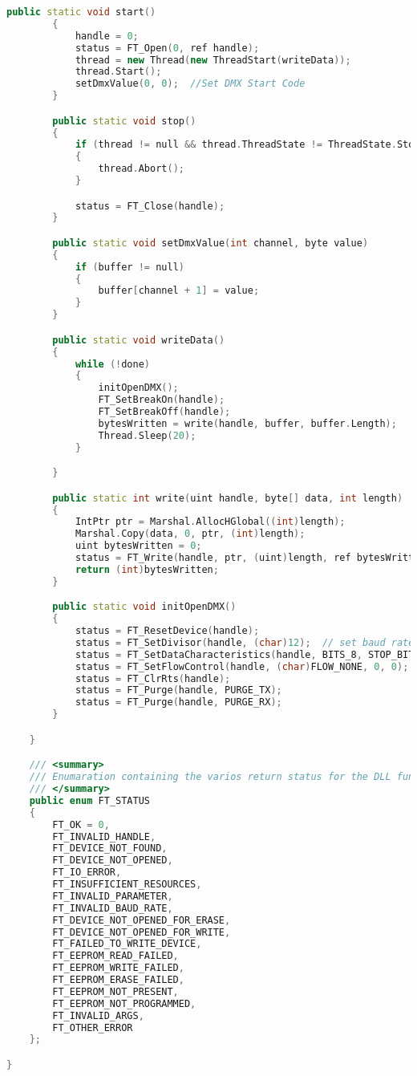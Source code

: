 \begin{lstlisting}[language=C++]
        public static void start()
        {
            handle = 0;
            status = FT_Open(0, ref handle);
            thread = new Thread(new ThreadStart(writeData));
            thread.Start();
            setDmxValue(0, 0);  //Set DMX Start Code
        }

        public static void stop()
        {
            if (thread != null && thread.ThreadState != ThreadState.Stopped)
            {
                thread.Abort();
            }

            status = FT_Close(handle);
        }

        public static void setDmxValue(int channel, byte value)
        {
            if (buffer != null)
            {
                buffer[channel + 1] = value;
            }
        }

        public static void writeData()
        {
            while (!done)
            {
                initOpenDMX();
                FT_SetBreakOn(handle);
                FT_SetBreakOff(handle);
                bytesWritten = write(handle, buffer, buffer.Length);
                Thread.Sleep(20);
            }

        }

        public static int write(uint handle, byte[] data, int length)
        {
            IntPtr ptr = Marshal.AllocHGlobal((int)length);
            Marshal.Copy(data, 0, ptr, (int)length);
            uint bytesWritten = 0;
            status = FT_Write(handle, ptr, (uint)length, ref bytesWritten);
            return (int)bytesWritten;
        }

        public static void initOpenDMX()
        {
            status = FT_ResetDevice(handle);
            status = FT_SetDivisor(handle, (char)12);  // set baud rate
            status = FT_SetDataCharacteristics(handle, BITS_8, STOP_BITS_2, PARITY_NONE);
            status = FT_SetFlowControl(handle, (char)FLOW_NONE, 0, 0);
            status = FT_ClrRts(handle);
            status = FT_Purge(handle, PURGE_TX);
            status = FT_Purge(handle, PURGE_RX);
        }

    }

    /// <summary>
    /// Enumaration containing the varios return status for the DLL functions.
    /// </summary>
    public enum FT_STATUS
    {
        FT_OK = 0,
        FT_INVALID_HANDLE,
        FT_DEVICE_NOT_FOUND,
        FT_DEVICE_NOT_OPENED,
        FT_IO_ERROR,
        FT_INSUFFICIENT_RESOURCES,
        FT_INVALID_PARAMETER,
        FT_INVALID_BAUD_RATE,
        FT_DEVICE_NOT_OPENED_FOR_ERASE,
        FT_DEVICE_NOT_OPENED_FOR_WRITE,
        FT_FAILED_TO_WRITE_DEVICE,
        FT_EEPROM_READ_FAILED,
        FT_EEPROM_WRITE_FAILED,
        FT_EEPROM_ERASE_FAILED,
        FT_EEPROM_NOT_PRESENT,
        FT_EEPROM_NOT_PROGRAMMED,
        FT_INVALID_ARGS,
        FT_OTHER_ERROR
    };

}

\end{lstlisting}


